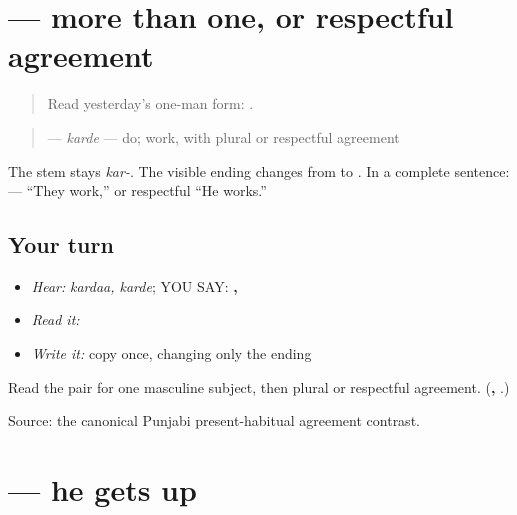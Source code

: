 \section[\texorpdfstring{\pa{ਕਰਦੇ} (karde)}{ਕਰਦੇ (karde)}]{ — more than one, or respectful agreement}

\label{lesson:PA-C183-karde}



\begin{quote}
Read yesterday’s one-man form: \textbf{}.
\end{quote}

\begin{grammarlens}[title={Grammar Lens: change only the ending}]
\begin{quote}
\textbf{} — \emph{karde} — do; work, with plural or respectful agreement
\end{quote}

The stem stays \emph{kar-}. The visible ending changes from \textbf{} to \textbf{}. In a complete sentence: \textbf{   } — “They work,” or respectful “He works.”
\end{grammarlens}

\subsection*{Your turn}
\begin{itemize}
\raggedright
  \item \emph{Hear:} \emph{kardaa, karde}; YOU SAY: \textbf{, }
  \item \emph{Read it:} \textbf{}
  \item \emph{Write it:} copy \textbf{} once, changing only the ending
\end{itemize}

\begin{tcolorbox}[breakable,colback=teal!4,colframe=teal!35!black,title={Before you move on}]
Read the pair for one masculine subject, then plural or respectful agreement. (\textbf{, }.)

Source: the canonical Punjabi present-habitual agreement contrast.
\end{tcolorbox}
\section[\texorpdfstring{\pa{ਉੱਠਦਾ} (utthdaa)}{ਉੱਠਦਾ (utthdaa)}]{ — he gets up}

